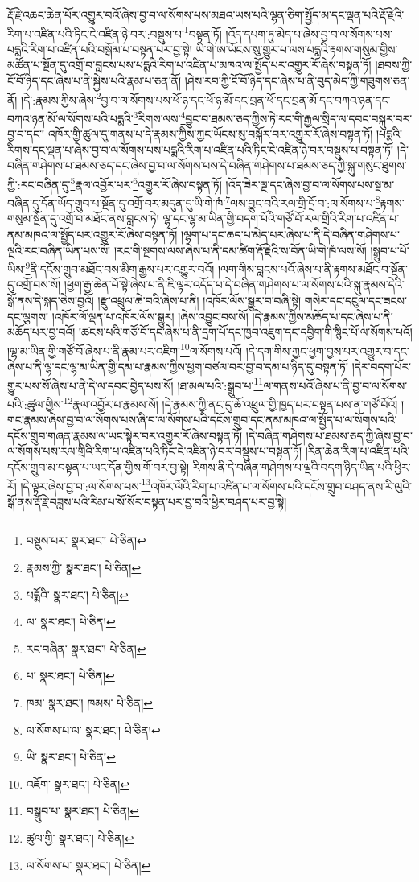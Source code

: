 རྡོ་རྗེ་འཆང་ཆེན་པོར་འགྱུར་བའོ་ཞེས་བྱ་བ་ལ་སོགས་པས་མཐའ་ཡས་པའི་ལྷན་ཅིག་སྤྱོད་མ་དང་ལྡན་པའི་རྡོ་རྗེའི་རིག་པ་འཛིན་པའི་ཏིང་ངེ་འཛིན་ཉེ་བར་:བསྡུས་པ་\footnote{བསྡུས་པར་  སྣར་ཐང་།  པེ་ཅིན། }བསྟན་ཏོ། །འོད་དཔག་ཏུ་མེད་པ་ཞེས་བྱ་བ་ལ་སོགས་པས་པདྨའི་རིག་པ་འཛིན་པའི་བསྒོམ་པ་བསྟན་པར་བྱ་སྟེ། ཡི་གེ་ཨ་ཡོངས་སུ་གྱུར་པ་ལས་པདྨའི་རྟགས་གསུམ་གྱིས་མཚོན་པ་སྔོན་དུ་འགྲོ་བ་བླངས་པས་པདྨའི་རིག་པ་འཛིན་པ་མཁའ་ལ་སྤྱོད་པར་འགྱུར་རོ་ཞེས་བསྟན་ཏོ། །ཐབས་ཀྱི་ངོ་བོ་ཉིད་དང་ཞེས་པ་ནི་སྐྱེས་པའི་རྣམ་པ་ཅན་ནོ། །ཤེས་རབ་ཀྱི་ངོ་བོ་ཉིད་དང་ཞེས་པ་ནི་བུད་མེད་ཀྱི་གཟུགས་ཅན་ནོ། །དེ་:རྣམས་ཀྱིས་ཞེས་\footnote{རྣམས་ཀྱི་  སྣར་ཐང་།  པེ་ཅིན། }བྱ་བ་ལ་སོགས་པས་ཕོ་ཉ་དང་ཕོ་ཉ་མོ་དང་བྲན་ཕོ་དང་བྲན་མོ་དང་བཀའ་ཉན་དང་བཀའ་ཉན་མོ་ལ་སོགས་པའི་པདྨའི་\footnote{པདྨོའི་  སྣར་ཐང་།  པེ་ཅིན། }རིགས་ལས་\footnote{ལ་  སྣར་ཐང་།  པེ་ཅིན། }བྱུང་བ་ཐམས་ཅད་ཀྱིས་ཏེ་རང་གི་རྒྱལ་སྲིད་ལ་དབང་བསྐུར་བར་བྱ་བ་དང་། འཁོར་གྱི་ཚུལ་དུ་གནས་པ་དེ་རྣམས་ཀྱིས་ཀྱང་ཡོངས་སུ་བསྐོར་བར་འགྱུར་རོ་ཞེས་བསྟན་ཏོ། །པདྨའི་རིགས་དང་ལྡན་པ་ཞེས་བྱ་བ་ལ་སོགས་པས་པདྨའི་རིག་པ་འཛིན་པའི་ཏིང་ངེ་འཛིན་ཉེ་བར་བསྡུས་པ་བསྟན་ཏོ། །དེ་བཞིན་གཤེགས་པ་ཐམས་ཅད་དང་ཞེས་བྱ་བ་ལ་སོགས་པས་དེ་བཞིན་གཤེགས་པ་ཐམས་ཅད་ཀྱི་སྐུ་གསུང་ཐུགས་ཀྱི་:རང་བཞིན་དུ་\footnote{རང་བཞིན་  སྣར་ཐང་།  པེ་ཅིན། }རྣལ་འབྱོར་པར་\footnote{པ་  སྣར་ཐང་།  པེ་ཅིན། }འགྱུར་རོ་ཞེས་བསྟན་ཏོ། །འོད་ཟེར་ལྔ་དང་ཞེས་བྱ་བ་ལ་སོགས་པས་སྔ་མ་བཞིན་དུ་དོན་ཡོད་གྲུབ་པ་སྔོན་དུ་འགྲོ་བར་མདུན་དུ་ཡི་གེ་ཁཾ་\footnote{ཁམ་  སྣར་ཐང་། ཁམས་  པེ་ཅིན། }ལས་བྱུང་བའི་རལ་གྲི་དྲོ་བ་:ལ་སོགས་པ་\footnote{ལ་སོགས་པ་ལ་  སྣར་ཐང་།  པེ་ཅིན། }རྟགས་གསུམ་སྔོན་དུ་འགྲོ་བ་མཐོང་ནས་བླངས་ཏེ། ལྷ་དང་ལྷ་མ་ཡིན་གྱི་བདག་པོའི་གཙོ་བོ་རལ་གྲིའི་རིག་པ་འཛིན་པ་ནམ་མཁའ་ལ་སྤྱོད་པར་འགྱུར་རོ་ཞེས་བསྟན་ཏོ། །ལྷག་པ་དང་ཆད་པ་མེད་པར་ཞེས་པ་ནི་དེ་བཞིན་གཤེགས་པ་ལྔའི་རང་བཞིན་ཡིན་པས་སོ། །རང་གི་སྔགས་ལས་ཞེས་པ་ནི་དམ་ཚིག་རྡོ་རྗེའི་ས་བོན་ཡི་གེ་ཁཾ་ལས་སོ། །སྒྲུབ་པ་པོ་ཡིས་\footnote{ཡི་  སྣར་ཐང་།  པེ་ཅིན། }ནི་དངོས་གྲུབ་མཐོང་བས་མིག་རྒྱས་པར་འགྱུར་བའོ། །ལག་གིས་བླངས་པའོ་ཞེས་པ་ནི་རྟགས་མཐོང་བ་སྔོན་དུ་འགྲོ་བས་སོ། །ཕྱག་རྒྱ་ཆེན་པོ་སྟེ་ཞེས་པ་ནི་ཇི་ལྟར་འདོད་པ་དེ་བཞིན་གཤེགས་པ་ལ་སོགས་པའི་སྐུ་རྣམས་དེའི་སྒོ་ནས་དེ་སྐད་ཅེས་བྱའོ། །རྫུ་འཕྲུལ་ཆེ་བའི་ཞེས་པ་ནི། །འཁོར་ལོས་སྒྱུར་བ་བཞི་སྟེ། གསེར་དང་དངུལ་དང་ཟངས་དང་ལྕགས། །འཁོར་ལོ་ལྡན་པ་འཁོར་ལོས་སྒྱུར། །ཞེས་འབྱུང་བས་སོ། །དེ་རྣམས་ཀྱིས་མཆོད་པ་དང་ཞེས་པ་ནི་མཆོད་པར་བྱ་བའོ། །ཚངས་པའི་གཙོ་བོ་དང་ཞེས་པ་ནི་དྲག་པོ་དང་ཁྱབ་འཇུག་དང་དབྱིག་གི་སྙིང་པོ་ལ་སོགས་པའོ། །ལྷ་མ་ཡིན་གྱི་གཙོ་བོ་ཞེས་པ་ནི་རྣམ་པར་འཇིག་\footnote{འཇོག་  སྣར་ཐང་།  པེ་ཅིན། }ལ་སོགས་པའོ། །དེ་དག་གིས་ཀྱང་ཕྱག་བྱས་པར་འགྱུར་བ་དང་ཞེས་པ་ནི་ལྷ་དང་ལྷ་མ་ཡིན་གྱི་དམ་པ་རྣམས་ཀྱིས་ཕྱག་བཙལ་བར་བྱ་བ་དམ་པ་ཉིད་དུ་བསྟན་ཏོ། །དེར་བདག་པོར་གྱུར་པས་སོ་ཞེས་པ་ནི་དེ་ལ་དབང་བྱེད་པས་སོ། །ཐ་མལ་པའི་:སྒྲུབ་པ་\footnote{བསྒྲུབ་པ་  སྣར་ཐང་།  པེ་ཅིན། }ལ་གནས་པའོ་ཞེས་པ་ནི་བྱ་བ་ལ་སོགས་པའི་:ཚུལ་གྱིས་\footnote{ཚུལ་གྱི་  སྣར་ཐང་།  པེ་ཅིན། }རྣལ་འབྱོར་པ་རྣམས་སོ། །དེ་རྣམས་ཀྱི་ནང་དུ་ཆོ་འཕྲུལ་གྱི་ཁྱད་པར་བསྟན་པས་ན་གཙོ་བོའོ། །གང་རྣམས་ཞེས་བྱ་བ་ལ་སོགས་པས་ཞི་བ་ལ་སོགས་པའི་དངོས་གྲུབ་དང་ནམ་མཁའ་ལ་སྤྱོད་པ་ལ་སོགས་པའི་དངོས་གྲུབ་གཞན་རྣམས་ལ་ཡང་སྟེར་བར་འགྱུར་རོ་ཞེས་བསྟན་ཏོ། །དེ་བཞིན་གཤེགས་པ་ཐམས་ཅད་ཀྱི་ཞེས་བྱ་བ་ལ་སོགས་པས་རལ་གྲིའི་རིག་པ་འཛིན་པའི་ཏིང་ངེ་འཛིན་ཉེ་བར་བསྡུས་པ་བསྟན་ཏོ། །རིན་ཆེན་རིག་པ་འཛིན་པའི་དངོས་གྲུབ་མ་བསྟན་པ་ཡང་དོན་གྱིས་གོ་བར་བྱ་སྟེ། རིགས་ནི་དེ་བཞིན་གཤེགས་པ་ལྔའི་བདག་ཉིད་ཡིན་པའི་ཕྱིར་རོ། །དེ་ལྟར་ཞེས་བྱ་བ་:ལ་སོགས་པས་\footnote{ལ་སོགས་པ་  སྣར་ཐང་།  པེ་ཅིན། }འཁོར་ལོའི་རིག་པ་འཛིན་པ་ལ་སོགས་པའི་དངོས་གྲུབ་བཤད་ནས་རི་ལུའི་སྒོ་ནས་རྡོ་རྗེ་བཟླས་པའི་རིམ་པ་སོ་སོར་བསྟན་པར་བྱ་བའི་ཕྱིར་བཤད་པར་བྱ་སྟེ། 
